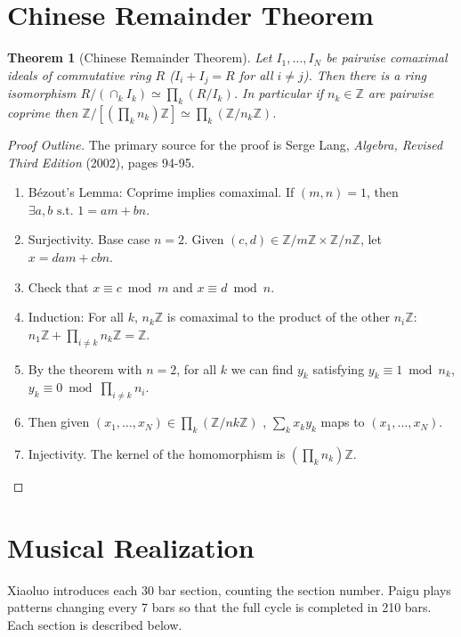 \documentclass[12pt]{article}
\newtheorem*{theorem}{Theorem}
\begin{document}
\section{Chinese Remainder Theorem}

\begin{theorem}[Chinese Remainder Theorem]
  Let $I_1,\ldots,I_N$ be pairwise comaximal ideals of commutative
  ring $R$ ($I_i+I_j = R$ for all $i\ne j$). Then there is a ring
  isomorphism $R / (\cap_k I_k) \simeq \prod_k (R / I_k)$. In
  particular if $n_k \in \mathbb{Z}$ are pairwise coprime then
  $\mathbb{Z} / [(\prod_k n_k)\mathbb{Z}] \simeq \prod_k (\mathbb{Z} /
  n_k\mathbb{Z})$.
\end{theorem}

\begin{proof}[Proof Outline]
  The primary source for the proof is Serge Lang, \textit{Algebra,
    Revised Third Edition} (2002), pages 94-95.
  \begin{enumerate}
    \item Bézout’s Lemma: Coprime implies comaximal. If $(m,n) = 1$,
      then $\exists a,b \text{ s.t. } 1 = am + bn$.
    \item Surjectivity. Base case $n=2$. Given $(c,d) \in \mathbb{Z} /
      m\mathbb{Z} \times \mathbb{Z} / n\mathbb{Z}$, let $x =dam + cbn$.
    \item Check that $x \equiv c \bmod m$ and $x \equiv d \bmod n$.
    \item Induction: For all $k$, $n_k\mathbb{Z}$ is comaximal to the
      product of the other $n_i\mathbb{Z}$: $n_1\mathbb{Z} + \prod_{i
        \ne k}n_k\mathbb{Z} = \mathbb{Z}$.
    \item By the theorem with $n=2$, for all $k$ we can find $y_k$
      satisfying $y_k \equiv 1 \bmod n_k$, $y_k \equiv 0 \bmod \prod_{i\ne
        k}n_i$.
    \item Then given $(x_1,\ldots,x_N) \in \prod_k (\mathbb{Z} /
      nk\mathbb{Z})$ , $\sum_k x_ky_k$ maps to $(x_1,\ldots,x_N)$.
    \item Injectivity. The kernel of the homomorphism is
      $(\prod_k n_k)\mathbb{Z}$.
  \end{enumerate}
\end{proof}

\section{Musical Realization}

Xiaoluo introduces each 30 bar section, counting the section
number. Paigu plays patterns changing every 7 bars so that the full
cycle is completed in 210 bars. Each section is described below.
\end{document}
